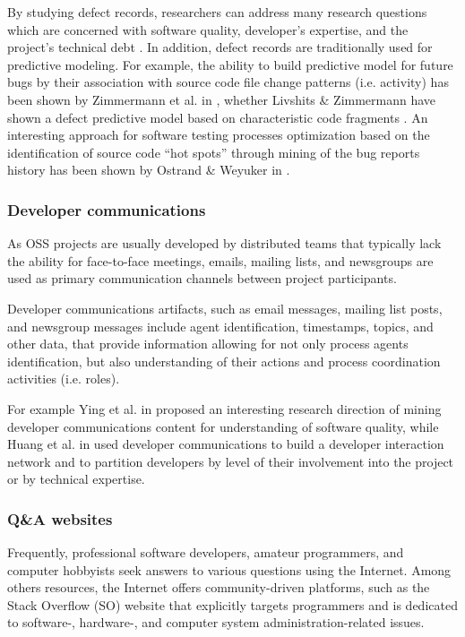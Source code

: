 By studying defect records, researchers can address many research questions which are concerned with software quality,
developer's expertise, and the project's technical debt \cite{citeulike:12550438}. 
In addition, defect records are traditionally used for predictive modeling.
For example, the ability to build predictive model for future bugs by their association with source code file change patterns 
(i.e. activity) has been shown by Zimmermann et al. in \cite{citeulike:6055293}, whether Livshits \& Zimmermann 
have shown a defect predictive model based on characteristic code fragments \cite{citeulike:393158}. 
An interesting approach for software testing processes optimization based on the identification of source code 
``hot spots'' through mining of the bug reports history has been shown by Ostrand \& Weyuker in \cite{ostrand2004tool}.

\subsubsection{Developer communications}
As OSS projects are usually developed by distributed teams that typically lack the ability for face-to-face meetings, 
emails, mailing lists, and newsgroups are used as primary communication channels between project participants. 

Developer communications artifacts, such as email messages, mailing list posts, and newsgroup messages include 
agent identification, timestamps, topics, and other data, that provide information allowing for not only process agents 
identification, but also understanding of their actions and process coordination activities (i.e. roles). 


For example Ying et al. in \cite{citeulike:1366052} proposed an interesting research direction of mining developer 
communications content for understanding of software quality, while Huang et al. in \cite{citeulike:9495129} used developer 
communications to build a developer interaction network and to partition developers by level of their involvement into the 
project or by technical expertise.

\subsubsection{Q\&A websites}
Frequently, professional software developers, amateur programmers, and computer hobbyists seek answers to various questions 
using the Internet. 
Among others resources, the Internet offers com\-munity-driven platforms, such as the Stack Overflow (SO) website that explicitly 
targets programmers and is dedicated to software-, hardware-, and computer system administration-related issues.

